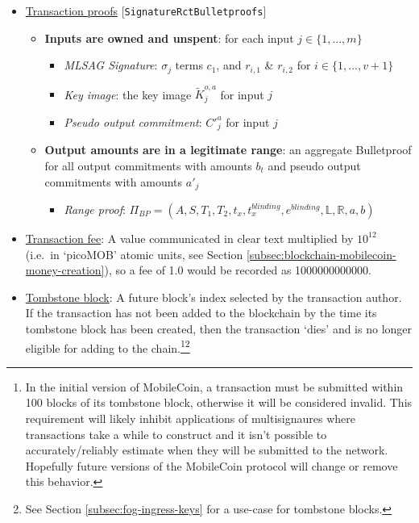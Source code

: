 \begin{itemize}
    \item \underline{Transaction proofs} [{\tt SignatureRctBulletproofs}]
    \begin{itemize}
        \item \textbf{Inputs are owned and unspent}: for each input $j \in \{1,...,m\}$
        \begin{itemize}
            \item \textit{MLSAG Signature}: $\sigma_j$ terms $c_1$, and $r_{i,1}$ \& $r_{i,2}$ for $i \in \{1,...,v+1\}$
            \item \textit{Key image}: the key image $\tilde{K}^{o,a}_j$ for input $j$
            \item \textit{Pseudo output commitment}: $C'^{a}_j$ for input $j$
        \end{itemize}
        \item \textbf{Output amounts are in a legitimate range}: an aggregate Bulletproof for all output commitments with amounts $b_t$ and pseudo output commitments with amounts $a'_j$
        \begin{itemize}
            \item \textit{Range proof}: $\Pi_{BP} = (A, S, T_1, T_2, t_x, t^{blinding}_x, e^{blinding}, \mathbb{L}, \mathbb{R}, a, b)$
        \end{itemize}
    \end{itemize}

    \item \underline{Transaction fee}: A value communicated in clear text multiplied by $10^{12}$ (i.e.\ in `picoMOB' atomic units, see Section \ref{subsec:blockchain-mobilecoin-money-creation}), so a fee of 1.0 would be recorded as 1000000000000.
    \item \underline{Tombstone block}: A future block's index selected by the transaction author. If the transaction has not been added to the blockchain by the time its tombstone block has been created, then the transaction `dies' and is no longer eligible for adding to the chain.\footnote{In the initial version of MobileCoin, a transaction must be submitted within 100 blocks of its tombstone block, otherwise it will be considered invalid. This requirement will likely inhibit applications of multisignaures \cite{ztm-2} where transactions take a while to construct and it isn't possible to accurately/reliably estimate when they will be submitted to the network. Hopefully future versions of the MobileCoin protocol will change or remove this behavior.}\footnote{See Section \ref{subsec:fog-ingress-keys} for a use-case for tombstone blocks.}
\end{itemize}



